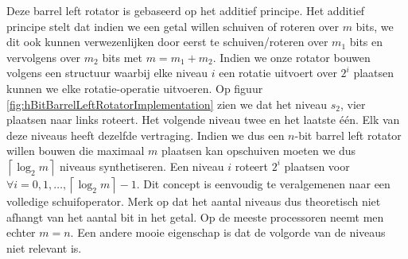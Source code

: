Deze barrel left rotator is gebaseerd op het additief principe. Het additief principe stelt dat indien we een getal willen schuiven of roteren over $m$ bits, we dit ook kunnen verwezenlijken door eerst te schuiven/roteren over $m_1$ bits en vervolgens over $m_2$ bits met $m=m_1+m_2$. Indien we onze rotator bouwen volgens een structuur waarbij elke niveau $i$ een rotatie uitvoert over $2^i$ plaatsen kunnen we elke rotatie-operatie uitvoeren. Op figuur \ref{fig:hBitBarrelLeftRotatorImplementation} zien we dat het niveau $s_2$, vier plaatsen naar links roteert. Het volgende niveau twee en het laatste \'e\'en. Elk van deze niveaus heeft dezelfde vertraging. Indien we dus een $n$-bit barrel left rotator willen bouwen die maximaal $m$ plaatsen kan opschuiven moeten we dus $\left\lceil\log_2m\right\rceil$ niveaus synthetiseren. Een niveau $i$ roteert $2^i$ plaatsen voor $\forall i=0,1,\ldots,\left\lceil\log_2m\right\rceil-1$. Dit concept is eenvoudig te veralgemenen naar een volledige schuifoperator. Merk op dat het aantal niveaus dus theoretisch niet afhangt van het aantal bit in het getal. Op de meeste processoren neemt men echter $m=n$. Een andere mooie eigenschap is dat de volgorde van de niveaus niet relevant is.
